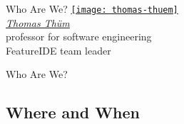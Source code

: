 \begin{frame}{\myframetitle}
	\begin{mycolumns}[animation=none]
		\begin{note}{Who Are We?}
			\centering
			\href{https://www.uni-ulm.de/en/in/sp/team/thuem/}{\texttt{[image: thomas-thuem]}}\\[.5ex]
			\href{https://www.uni-ulm.de/en/in/sp/team/thuem/}{\emph{Thomas Thüm}}\\[.5ex]
			\small professor for software engineering\\[.5ex]
			FeatureIDE team leader
		\end{note}
	\mynextcolumn
		\begin{note}{Who Are We?} %
			\centering
		\end{note}
	\end{mycolumns}
\end{frame}

\subsection{Where and When}

